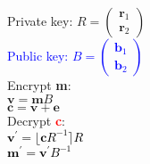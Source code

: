 \begin{frame}
	\textcolor{gray!80}{Private key:} 
	\textcolor{gray!80}{%
		$R =
		\begin{pmatrix}
			\mathbf{r}_1 \\[0.3em] 
			\mathbf{r}_2
		\end{pmatrix}$
	}
	\\
	\textcolor{blue}{Public key:}
	\textcolor{blue}{%
		$B = \begin{pmatrix}
			\mathbf{b}_1 \\[0.3em] 
			\mathbf{b}_2
		\end{pmatrix}$
	}
	\\
	\textcolor{gray!80}{Encrypt \textbf{m}:\\}
	\hspace{1.0em} \textcolor{gray!80}{$\mathbf{v} = \mathbf{m}B$}\\
	\hspace{1.0em} \textcolor{gray!80}{$\mathbf{c} = \mathbf{v} + \mathbf{e}$}\\
	
	\textcolor{black!80}{Decrypt \textcolor{red}{\textbf{c}}:\\}
	\hspace{1.0em} \textcolor{black}{$\mathbf{v^{\prime}} = \lfloor\mathbf{c}R^{-1}\rceil  R$}\\
	\hspace{1.0em} \textcolor{black}{$\mathbf{m^{\prime}} = \mathbf{v^{\prime}}B^{-1}$}
	
\end{frame}

